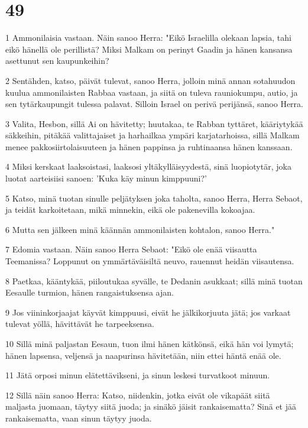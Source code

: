 \chapter{49}

\par 1 Ammonilaisia vastaan. Näin sanoo Herra: "Eikö Israelilla olekaan lapsia, tahi eikö hänellä ole perillistä? Miksi Malkam on perinyt Gaadin ja hänen kansansa asettunut sen kaupunkeihin?
\par 2 Sentähden, katso, päivät tulevat, sanoo Herra, jolloin minä annan sotahuudon kuulua ammonilaisten Rabbaa vastaan, ja siitä on tuleva rauniokumpu, autio, ja sen tytärkaupungit tulessa palavat. Silloin Israel on perivä perijänsä, sanoo Herra.
\par 3 Valita, Hesbon, sillä Ai on hävitetty; huutakaa, te Rabban tyttäret, kääriytykää säkkeihin, pitäkää valittajaiset ja harhailkaa ympäri karjatarhoissa, sillä Malkam menee pakkosiirtolaisuuteen ja hänen pappinsa ja ruhtinaansa hänen kanssaan.
\par 4 Miksi kerskaat laaksoistasi, laaksosi yltäkylläisyydestä, sinä luopiotytär, joka luotat aarteisiisi sanoen: 'Kuka käy minun kimppuuni?'
\par 5 Katso, minä tuotan sinulle peljätyksen joka taholta, sanoo Herra, Herra Sebaot, ja teidät karkoitetaan, mikä minnekin, eikä ole pakenevilla kokoajaa.
\par 6 Mutta sen jälkeen minä käännän ammonilaisten kohtalon, sanoo Herra."
\par 7 Edomia vastaan. Näin sanoo Herra Sebaot: "Eikö ole enää viisautta Teemanissa? Loppunut on ymmärtäväisiltä neuvo, rauennut heidän viisautensa.
\par 8 Paetkaa, kääntykää, piiloutukaa syvälle, te Dedanin asukkaat; sillä minä tuotan Eesaulle turmion, hänen rangaistuksensa ajan.
\par 9 Jos viininkorjaajat käyvät kimppuusi, eivät he jälkikorjuuta jätä; jos varkaat tulevat yöllä, hävittävät he tarpeeksensa.
\par 10 Sillä minä paljastan Eesaun, tuon ilmi hänen kätkönsä, eikä hän voi lymytä; hänen lapsensa, veljensä ja naapurinsa hävitetään, niin ettei häntä enää ole.
\par 11 Jätä orposi minun elätettävikseni, ja sinun leskesi turvatkoot minuun.
\par 12 Sillä näin sanoo Herra: Katso, niidenkin, jotka eivät ole vikapäät siitä maljasta juomaan, täytyy siitä juoda; ja sinäkö jäisit rankaisematta? Sinä et jää rankaisematta, vaan sinun täytyy juoda.
